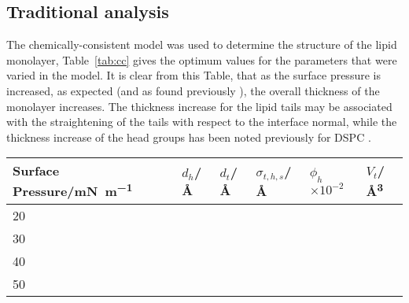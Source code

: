 \subsection{Traditional analysis}
The chemically-consistent model was used to determine the structure of the lipid monolayer, Table~\ref{tab:cc} gives the optimum values for the parameters that were varied in the model.
It is clear from this Table, that as the surface pressure is increased, as expected (and as found previously \cite{mohwald_phospholipid_1990,vaknin_structural_1991}), the overall thickness of the monolayer increases.
The thickness increase for the lipid tails may be associated with the straightening of the tails with respect to the interface normal, while the thickness increase of the head groups has been noted previously for DSPC \cite{hollinshead_effects_2009}.
%
\begin{table*}
\small
  \caption{\ The values for the parameters allowed to vary in the fitting of the chemically-consistent model, at each surface pressure measured.}
  \label{tab:cc}
  \begin{tabular*}{\textwidth}{@{\extracolsep{\fill}}llllll}
    \hline
    Surface Pressure/\si{\milli\newton\per\meter} & $d_h$/\si{\angstrom} & $d_t$/\si{\angstrom} & $\sigma_{t,h,s}$/\si{\angstrom} & $\phi_h$$\times10^{-2}$ & $V_t$/\si{\angstrom\cubed} \\
    \hline
    20 &  &  &  &  &  \\
    30 &  &  &  &  &  \\
    40 &  &  &  &  &  \\
    50 &  &  &  &  &  \\
    \hline
  \end{tabular*}
\end{table*}
%

